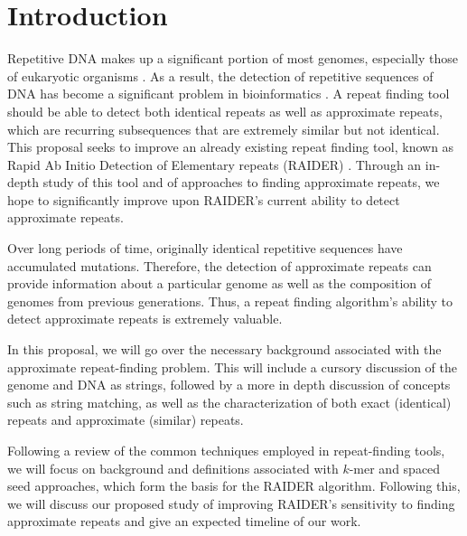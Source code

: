 \chapter{Introduction}
\label{intro}
Repetitive DNA makes up a significant portion of most genomes, especially those of eukaryotic organisms \cite{britten1968repeated}. As a result, the detection of repetitive sequences of DNA has become a significant problem in bioinformatics \cite{pevzner2004de-novo}. A repeat finding tool should be able to detect both identical repeats as well as approximate repeats, which are recurring subsequences that are extremely similar but not identical. This proposal seeks to improve an already existing repeat finding tool, known as Rapid Ab Initio Detection of Elementary repeats (RAIDER) \cite{figueroa2013raider}. Through an in-depth study of this tool and of approaches to finding approximate repeats, we hope to significantly improve upon RAIDER's current ability to detect approximate repeats.

Over long periods of time, originally identical repetitive sequences have accumulated mutations. Therefore, the detection of approximate repeats can provide information about a particular genome as well as the composition of genomes from previous generations. Thus, a repeat finding algorithm's ability to detect approximate repeats is extremely valuable.

In this proposal, we will go over the necessary background associated with the approximate repeat-finding problem. This will include a cursory discussion of the genome and DNA as strings, followed by a more in depth discussion of concepts such as string matching, as well as the characterization of both exact (identical) repeats and approximate (similar) repeats. 

Following a review of the common techniques employed in repeat-finding tools, we will focus on background and definitions associated with $k$-mer and spaced seed approaches, which form the basis for the RAIDER algorithm. Following this, we will discuss our proposed study of improving RAIDER's sensitivity to finding approximate repeats and give an expected timeline of our work.

\clearpage